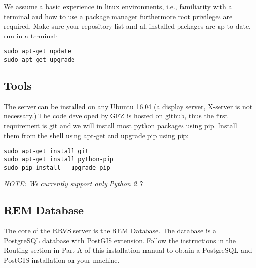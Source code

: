 \documentclass{article}
\begin{document}
We assume a basic experience in linux environments, i.e., familiarity
with a terminal and how to use a package manager furthermore root
privileges are required.
Make sure your repository list and all installed packages 
are up-to-date, run in a terminal:
\begin{verbatim}
sudo apt-get update
sudo apt-get upgrade
\end{verbatim}

\subsection{Tools}
The server can be installed on any Ubuntu 16.04 (a display server, X-server is not necessary.)
The code developed by GFZ is hosted on github, thus the first requirement is git and we will install most python packages using pip.
Install them from the shell using apt-get and upgrade pip using pip:

\begin{verbatim}
sudo apt-get install git
sudo apt-get install python-pip
sudo pip install --upgrade pip
\end{verbatim}

\textit{NOTE: We currently support only Python 2.7}

\subsection{REM Database}
The core of the RRVS server is the REM Database. The database
is a PostgreSQL database with PostGIS extension. Follow the 
instructions in the Routing section in Part A of this installation 
manual to obtain a
PostgreSQL and PostGIS installation on your machine.


\end{document}

